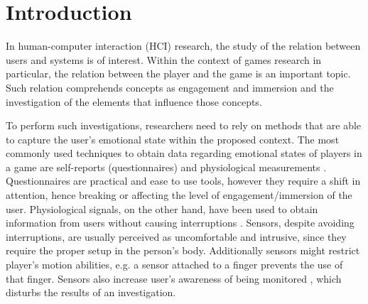 \chapter{Introduction}
\label{c:introduction}

In human-computer interaction (HCI) research, the study of the relation between users and systems is of interest. Within the context of games research in particular, the relation between the player and the game is an important topic. Such relation comprehends concepts as engagement and immersion \parencite{boyle2012engagement} and the investigation of the elements that influence those concepts.

To perform such investigations, researchers need to rely on methods that are able to capture the user's emotional state within the proposed context. The most commonly used techniques to obtain data regarding emotional states of players in a game are self-reports (questionnaires) and physiological measurements \parencite{mekler2014systematic}. Questionnaires are practical and ease to use tools, however they require a shift in attention, hence breaking or affecting the level of engagement/immersion of the user. Physiological signals, on the other hand, have been used to obtain information from users without causing interruptions \parencite{bousefsaf2013remote,yun2009game,rani2006empirical,tijs2008dynamic}. Sensors, despite avoiding interruptions, are usually perceived as uncomfortable and intrusive, since they require the proper setup in the person's body. Additionally sensors might restrict player's motion abilities, e.g. a sensor attached to a finger prevents the use of that finger. Sensors also increase user's awareness of being monitored \parencite{yamakoshi2007preliminary,yamaguchi2006evaluation,healey2005detecting}, which disturbs the results of an investigation.


